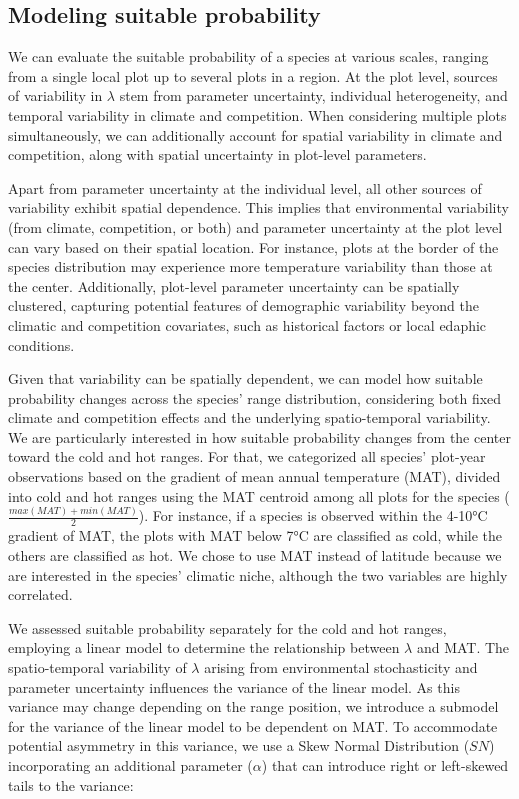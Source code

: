 \hypertarget{modeling-suitable-probability}{%
\subsection{Modeling suitable
probability}\label{modeling-suitable-probability}}

We can evaluate the suitable probability of a species at various scales,
ranging from a single local plot up to several plots in a region. At the
plot level, sources of variability in \(\lambda\) stem from parameter
uncertainty, individual heterogeneity, and temporal variability in
climate and competition. When considering multiple plots simultaneously,
we can additionally account for spatial variability in climate and
competition, along with spatial uncertainty in plot-level parameters.

Apart from parameter uncertainty at the individual level, all other
sources of variability exhibit spatial dependence. This implies that
environmental variability (from climate, competition, or both) and
parameter uncertainty at the plot level can vary based on their spatial
location. For instance, plots at the border of the species distribution
may experience more temperature variability than those at the center.
Additionally, plot-level parameter uncertainty can be spatially
clustered, capturing potential features of demographic variability
beyond the climatic and competition covariates, such as historical
factors or local edaphic conditions.

Given that variability can be spatially dependent, we can model how
suitable probability changes across the species' range distribution,
considering both fixed climate and competition effects and the
underlying spatio-temporal variability. We are particularly interested
in how suitable probability changes from the center toward the cold and
hot ranges. For that, we categorized all species' plot-year observations
based on the gradient of mean annual temperature (MAT), divided into
cold and hot ranges using the MAT centroid among all plots for the
species (\(\frac{max(MAT) + min(MAT)}{2}\)). For instance, if a species
is observed within the 4-10°C gradient of MAT, the plots with MAT below
7°C are classified as cold, while the others are classified as hot. We
chose to use MAT instead of latitude because we are interested in the
species' climatic niche, although the two variables are highly
correlated.

We assessed suitable probability separately for the cold and hot ranges,
employing a linear model to determine the relationship between
\(\lambda\) and MAT. The spatio-temporal variability of \(\lambda\)
arising from environmental stochasticity and parameter uncertainty
influences the variance of the linear model. As this variance may change
depending on the range position, we introduce a submodel for the
variance of the linear model to be dependent on MAT. To accommodate
potential asymmetry in this variance, we use a Skew Normal Distribution
(\(SN\)) incorporating an additional parameter (\(\alpha\)) that can
introduce right or left-skewed tails to the variance:

